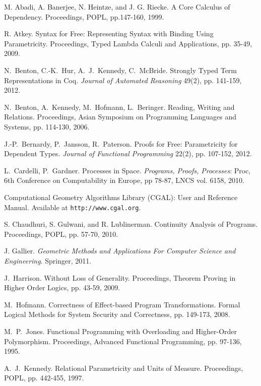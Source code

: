 \documentclass{sigplanconf}
\theoremstyle{examplestyle}
\theoremstyle{restatementstyle}
\begin{document}
\begin{thebibliography}{12}
\softraggedright

M. Abadi, A. Banerjee, N. Heintze, and J. G. Riecke. A Core Calculus
of Dependency. Proceedings, POPL, pp.147-160, 1999.

R. Atkey.  Syntax for Free: Representing Syntax with Binding Using
Parametricity.  Proceedings, Typed Lambda Calculi and Applications,
pp. 35-49, 2009.

N.~Benton, C.-K.~Hur, A.~J.~Kennedy, C.~McBride.
Strongly Typed Term Representations in {Coq}.
{\em Journal of Automated Reasoning} 49(2), pp. 141-159, 2012.

N.~Benton, A.~Kennedy, M.~Hofmann, L.~Beringer.
Reading, Writing and Relations.
Proceedings, Asian Symposium on Programming Languages and Systems,
pp. 114-130, 2006.

J.-P.~Bernardy, P.~Jansson, R.~Paterson.
Proofs for Free: Parametricity for Dependent Types.
{\em Journal of Functional Programming} 22(2), pp. 107-152, 2012.

L.~Cardelli, P.~Gardner.
Processes in Space.
{\em Programs, Proofs, Processes}: Proc, 6th Conference on Computability in Europe, pp 78-87, LNCS vol. 6158, 2010.

Computational Geometry Algorithms Library (CGAL): User and Reference
Manual.  Available at {\tt http://www.cgal.org}.

S. Chaudhuri, S. Gulwani, and R. Lublinerman.  Continuity Analysis of
Programs.  Proceedings, POPL, pp. 57-70, 2010.

J. Gallier. {\em Geometric Methods and Applications For Computer
Science and Engineering}. Springer, 2011.

J.~Harrison.
Without Loss of Generality.
Proceedings, Theorem Proving in Higher Order Logics,
pp. 43-59, 2009.

M.~Hofmann. Correctness of Effect-based Program
Transformations. Formal Logical Methods for System Security and
Correctness, pp. 149-173, 2008.

M.~P.~Jones.  Functional Programming with Overloading and Higher-Order
Polymorphism. Proceedings, Advanced Functional Programming,
pp. 97-136, 1995.

A.~J.~Kennedy. Relational Parametricity and Units of Measure.
Proceedings, POPL, pp. 442-455, 1997.


\end{thebibliography}
\end{document}
